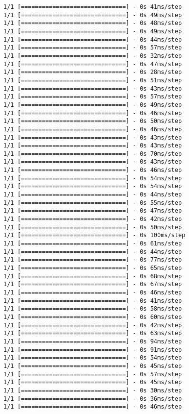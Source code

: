 \documentclass[11pt]{article}
\begin{document}
\begin{Verbatim}[commandchars=\\\{\}]
1/1 [==============================] - 0s 41ms/step
1/1 [==============================] - 0s 49ms/step
1/1 [==============================] - 0s 48ms/step
1/1 [==============================] - 0s 49ms/step
1/1 [==============================] - 0s 44ms/step
1/1 [==============================] - 0s 57ms/step
1/1 [==============================] - 0s 32ms/step
1/1 [==============================] - 0s 47ms/step
1/1 [==============================] - 0s 28ms/step
1/1 [==============================] - 0s 51ms/step
1/1 [==============================] - 0s 43ms/step
1/1 [==============================] - 0s 57ms/step
1/1 [==============================] - 0s 49ms/step
1/1 [==============================] - 0s 46ms/step
1/1 [==============================] - 0s 50ms/step
1/1 [==============================] - 0s 46ms/step
1/1 [==============================] - 0s 43ms/step
1/1 [==============================] - 0s 43ms/step
1/1 [==============================] - 0s 70ms/step
1/1 [==============================] - 0s 43ms/step
1/1 [==============================] - 0s 46ms/step
1/1 [==============================] - 0s 54ms/step
1/1 [==============================] - 0s 54ms/step
1/1 [==============================] - 0s 44ms/step
1/1 [==============================] - 0s 55ms/step
1/1 [==============================] - 0s 47ms/step
1/1 [==============================] - 0s 42ms/step
1/1 [==============================] - 0s 50ms/step
1/1 [==============================] - 0s 100ms/step
1/1 [==============================] - 0s 61ms/step
1/1 [==============================] - 0s 44ms/step
1/1 [==============================] - 0s 77ms/step
1/1 [==============================] - 0s 65ms/step
1/1 [==============================] - 0s 68ms/step
1/1 [==============================] - 0s 67ms/step
1/1 [==============================] - 0s 46ms/step
1/1 [==============================] - 0s 41ms/step
1/1 [==============================] - 0s 58ms/step
1/1 [==============================] - 0s 60ms/step
1/1 [==============================] - 0s 42ms/step
1/1 [==============================] - 0s 63ms/step
1/1 [==============================] - 0s 94ms/step
1/1 [==============================] - 0s 91ms/step
1/1 [==============================] - 0s 54ms/step
1/1 [==============================] - 0s 45ms/step
1/1 [==============================] - 0s 57ms/step
1/1 [==============================] - 0s 45ms/step
1/1 [==============================] - 0s 30ms/step
1/1 [==============================] - 0s 36ms/step
1/1 [==============================] - 0s 46ms/step

\end{Verbatim}
\end{document}
